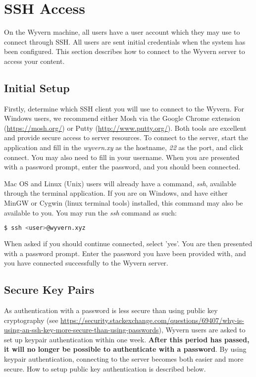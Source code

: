 \section{SSH Access}
\label{sec:ssh}

On the Wyvern machine, all users have a user account which they may use to connect through SSH. All users are sent initial credentials when the system has been configured. This section describes how to connect to the Wyvern server to access your content.

\subsection{Initial Setup}
Firstly, determine which SSH client you will use to connect to the Wyvern. For Windows users, we recommend either Mosh via the Google Chrome extension (\url{https://mosh.org/}) or Putty (\url{http://www.putty.org/}). Both tools are excellent and provide secure access to server resources. To connect to the server, start the application and fill in the \textit{wyvern.xy} as the hostname, \textit{22} as the port, and click connect. You may also need to fill in your username. When you are presented with a password prompt, enter the password, and you should been connected.

Mac OS and Linux (Unix) users will already have a command, \textit{ssh}, available through the terminal application. If you are on Windows, and have either MinGW or Cygwin (linux terminal tools) installed, this command may also be available to you. You may run the \textit{ssh} command as such:

\begin{lstlisting}[language=bash]
$ ssh <user>@wyvern.xyz
\end{lstlisting}

When asked if you should continue connected, select 'yes'. You are then presented with a password prompt. Enter the password you have been provided with, and you have connected successfully to the Wyvern server.

\subsection{Secure Key Pairs}
As authentication with a password is less secure than using public key cryptography (see \url{https://security.stackexchange.com/questions/69407/why-is-using-an-ssh-key-more-secure-than-using-passwords}), Wyvern users are asked to set up keypair authentication within one week. \textbf{After this period has passed, it will no longer be possible to authenticate with a password}. By using keypair authentication, connecting to the server becomes both easier and more secure. How to setup public key authentication is described below.

